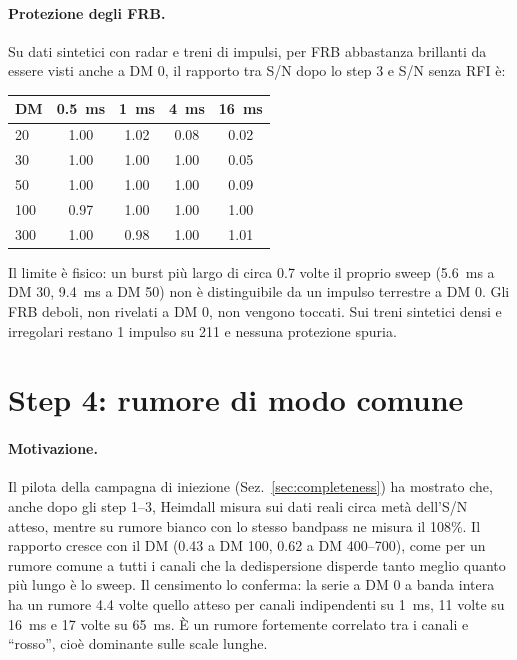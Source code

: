 \paragraph{Protezione degli FRB.} Su dati sintetici con radar e treni di impulsi, per FRB abbastanza brillanti da
essere visti anche a DM 0, il rapporto tra S/N dopo lo step 3 e S/N senza RFI è:
\begin{center}
\small
\begin{tabular}{lcccc}
\toprule
DM & \SI{0.5}{\milli\second} & \SI{1}{\milli\second} & \SI{4}{\milli\second} & \SI{16}{\milli\second} \\
\midrule
20 & 1.00 & 1.02 & 0.08 & 0.02 \\
30 & 1.00 & 1.00 & 1.00 & 0.05 \\
50 & 1.00 & 1.00 & 1.00 & 0.09 \\
100 & 0.97 & 1.00 & 1.00 & 1.00 \\
300 & 1.00 & 0.98 & 1.00 & 1.01 \\
\bottomrule
\end{tabular}
\end{center}
Il limite è fisico: un burst più largo di circa 0.7 volte il proprio sweep (\SI{5.6}{\milli\second} a DM 30,
\SI{9.4}{\milli\second} a DM 50) non è distinguibile da un impulso terrestre a DM 0. Gli FRB deboli, non rivelati a DM 0,
non vengono toccati. Sui treni sintetici densi e irregolari restano 1 impulso su 211 e nessuna protezione spuria.

\FloatBarrier
\section{Step 4: rumore di modo comune}
\label{sec:step4}

\paragraph{Motivazione.} Il pilota della campagna di iniezione (Sez.~\ref{sec:completeness}) ha mostrato che, anche dopo
gli step 1--3, Heimdall misura sui dati reali circa metà dell'S/N atteso, mentre su rumore bianco con lo stesso
bandpass ne misura il 108\%. Il rapporto cresce con il DM (0.43 a DM 100, 0.62 a DM 400--700), come per un rumore comune
a tutti i canali che la dedispersione disperde tanto meglio quanto più lungo è lo sweep. Il censimento lo conferma: la
serie a DM 0 a banda intera ha un rumore 4.4 volte quello atteso per canali indipendenti su \SI{1}{\milli\second}, 11 volte
su \SI{16}{\milli\second} e 17 volte su \SI{65}{\milli\second}. È un rumore fortemente correlato tra i canali e
``rosso'', cioè dominante sulle scale lunghe.

